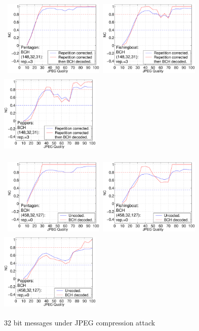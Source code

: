 \documentclass[12pt]{report}
\begin{document}
\begin{figure}[p]
\centerline{ \hbox{
\includegraphics[height=3.81cm,width=4.8cm]{EPS_BK_formattedBetter/ml32pent148.eps}
\includegraphics[height=3.81cm,width=4.8cm]{EPS_BK_formattedBetter/ml32fish148.eps}
\includegraphics[height=3.81cm,width=4.8cm]{EPS_BK_formattedBetter/ml32pep148.eps}
}}
 
\centerline{ \hbox{
\includegraphics[height=3.81cm,width=4.8cm]{EPS_BK_formattedBetter/ml32pent458.eps}
\includegraphics[height=3.81cm,width=4.8cm]{EPS_BK_formattedBetter/ml32fish458.eps}
\includegraphics[height=3.81cm,width=4.8cm]{EPS_BK_formattedBetter/ml32pep458.eps}
}}
 
        \caption{32 bit messages under JPEG compression attack}
        \label{fig:32aBK32_63_148}
 
\end{figure}
\end{document}
